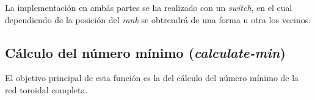 \documentclass[11pt]{article}
\newif\ifspanish %
\begin{document}
La implementación en ambás partes se ha realizado con un \textit{switch}, en el cual dependiendo de la posición del \textit{rank} se obtrendrá de una forma u otra los vecinos.

\subsection{Cálculo del número mínimo (\textit{calculate-min})}
El objetivo principal de esta función es la del cálculo del número mínimo de la red toroidal completa.













\newpage



\ifspanish
	\addcontentsline{toc}{section}{Referencias}
\else
\fi
\end{document}
